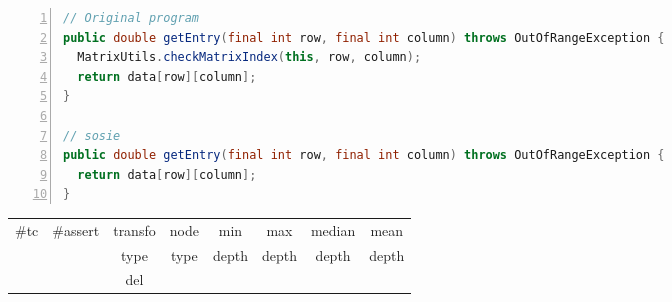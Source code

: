 \begin{minipage}{\columnwidth}
\begin{lstlisting}[caption={Two variants of \texttt{getEntry} in commons.maths},language=java,numbers=left]
// Original program
public double getEntry(final int row, final int column) throws OutOfRangeException {
  MatrixUtils.checkMatrixIndex(this, row, column);
  return data[row][column];
}

// sosie
public double getEntry(final int row, final int column) throws OutOfRangeException {
  return data[row][column];
}
\end{lstlisting}
\tabcolsep=0.11cm
\begin{tabular}{>{\small}c>{\small}c>{\small}c>{\small}c>{\small}c>{\small}c>{\small}c>{\small}c}
\hline
\rowcolor{lightgray} \#tc & \#assert & transfo & node & min & max & median & mean   \\
\rowcolor{lightgray}  & & type & type & depth  & depth & depth & depth  \\ 
\hline
 &  & del &  &  &  &  & \\
\hline
\end{tabular}
\end{minipage}